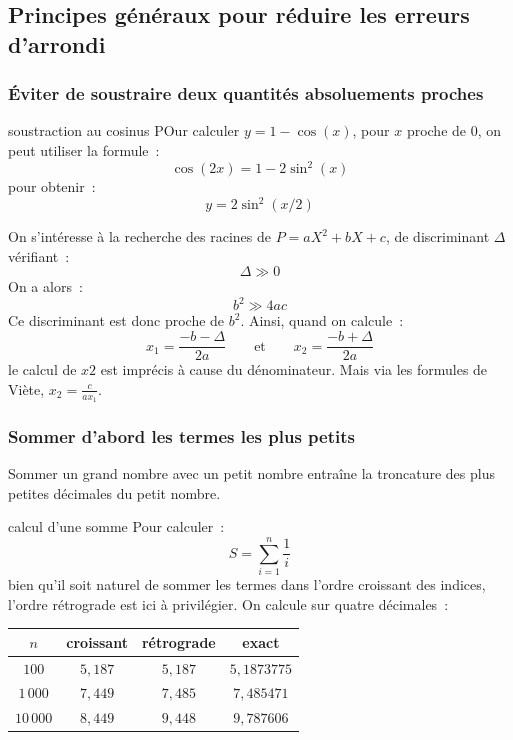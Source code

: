 \subsection{Principes généraux pour réduire les erreurs d'arrondi}

\subsubsection{Éviter de soustraire deux quantités absoluements proches}

\begin{exemple}{}{soustraction au cosinus}
    POur calculer $y = 1-\cos(x)$, pour $x$ proche de 0, on peut utiliser la formule~:
    $$\cos(2x) = 1 - 2\sin^2(x)$$
    pour obtenir~:
    $$y = 2 \sin^2(x/2)$$
\end{exemple}

\begin{exemple}{}{}
    On s'intéresse à la recherche des racines de $P = aX^2 + bX + c$, de discriminant $\Delta$ vérifiant~:
    $$\Delta \gg 0$$
    On a alors~:
    $$b^2 \gg 4ac$$
    Ce discriminant est donc proche de $b^2$. Ainsi, quand on calcule~:
    $$x_1 = \frac{-b-\Delta}{2a} \qquad \text{et} \qquad x_2 = \frac{-b + \Delta}{2a}$$ 
    le calcul de $x2$ est imprécis à cause du dénominateur. Mais via les formules de Viète, $x_2 = \frac{c}{ax_1}$.
\end{exemple}

\subsubsection{Sommer d'abord les termes les plus petits}
Sommer un grand nombre avec un petit nombre entraîne la troncature des plus petites décimales du petit nombre.
\begin{exemple}{}{calcul d'une somme}
    Pour calculer~:
    $$S = \sum_{i=1}^n \frac{1}{i}$$
    bien qu'il soit naturel de sommer les termes dans l'ordre croissant des indices, l'ordre rétrograde est ici à privilégier. On calcule sur quatre décimales~:\\
    \begin{center}
        \begin{tabular}{c|c|c|c}
            $n$ & croissant & rétrograde & exact\\
            \hline
            $100$ & $5,187$ & $5,187$ & $5,1873775$\\
            $1\,000$ & $7,449$ & $7,485$ & $7,485471$\\
            $10\,000$ & $8,449$ & $9,448$ & $9,787606$\\
            
        \end{tabular}
    \end{center}
\end{exemple}



